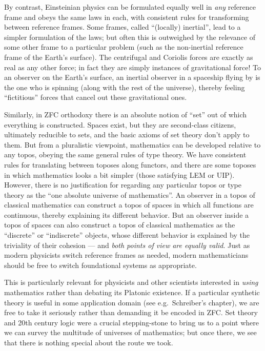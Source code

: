 \documentclass[10pt]{article}
\numberwithin{equation}{section}
\begin{document}
By contrast, Einsteinian physics can be formulated equally well in \emph{any} reference frame and obeys the same laws in each, with consistent rules for transforming between reference frames. %
Some frames, called ``(locally) inertial'', lead to a simpler formulation of the laws; but often this is outweighed by the relevance of some other frame to a particular problem (such as the non-inertial reference frame of the Earth's surface).
The centrifugal and Coriolis forces are exactly as real as any other force; in fact they are simply instances of gravitational force!
To an observer on the Earth's surface, an inertial observer in a spaceship flying by is the one who is spinning (along with the rest of the universe), thereby feeling ``fictitious'' forces that cancel out these gravitational ones.

Similarly, in ZFC orthodoxy there is an absolute notion of ``set'' out of which everything is constructed.
Spaces exist, but they are second-class citizens, ultimately reducible to sets, and the basic axioms of set theory don't apply to them.
But from a pluralistic viewpoint, mathematics can be developed relative to any topos, obeying the same general rules of type theory.
We have consistent rules for translating between toposes along functors, %
and there are some toposes in which mathematics looks a bit simpler (those satisfying LEM or UIP).
However, there is no justification for regarding any particular topos or type theory as the ``one absolute universe of mathematics''.
An observer in a topos of classical mathematics can construct a topos of spaces in which all functions are continuous, thereby explaining its different behavior.
But an observer inside a topos of spaces can also construct a topos of classical mathematics as the ``discrete'' or ``indiscrete'' objects, whose different behavior is explained by the triviality of their cohesion --- and \emph{both points of view are equally valid}.
Just as modern physicists switch reference frames as needed, modern mathematicians should be free to switch foundational systems as appropriate.

This is particularly relevant for physicists and other scientists interested in \emph{using} mathematics rather than debating its Platonic existence.
If a particular synthetic theory is useful in some application domain (see e.g.\ Schreiber's chapter), we are free to take it seriously rather than demanding it be encoded in ZFC.
Set theory and 20th century logic were a crucial stepping-stone to bring us to a point where we can survey the multitude of universes of mathematics; but once there, we see that there is nothing special about the route we took.




\end{document}
